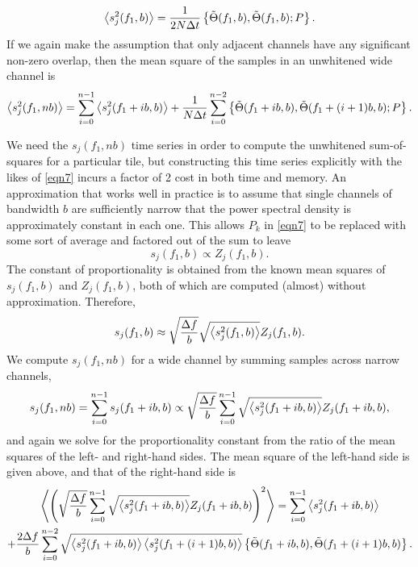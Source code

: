 \documentclass[10pt]{article}
\begin{document}
\begin{equation}
\left\langle s_{j}^{2}(f_{1}, b)\right\rangle
   = \frac{1}{2 N \Delta t} \left\{ \tilde{\Theta}(f_{1}, b),
   \tilde{\Theta}(f_{1}, b); P \right\}.
\end{equation}
If we again make the assumption that only adjacent channels have any
significant non-zero overlap, then the mean square of the samples in an
unwhitened wide channel is
\begin{equation}
\left\langle s_{j}^{2}(f_{1}, n b)\right\rangle
   = \sum_{i = 0}^{n - 1} \left\langle s_{j}^{2}(f_{1} + i b, b)\right\rangle + \frac{1}{N
   \Delta t} \sum_{i = 0}^{n - 2} \left\{ \tilde{\Theta}(f_{1} + i b, b),
   \tilde{\Theta}(f_{1} + (i + 1) b, b) ; P \right\}.
\end{equation}

We need the \(s_{j}(f_{1}, n b)\) time series in order to compute the
unwhitened sum-of-squares for a particular tile, but constructing this time
series explicitly with the likes of \eqref{eqn7} incurs a factor of 2 cost
in both time and memory.  An approximation that works well in practice is
to assume that single channels of bandwidth \(b\) are sufficiently narrow
that the power spectral density is approximately constant in each one.
This allows \(P_{k}\) in \eqref{eqn7} to be replaced with some sort of
average and factored out of the sum to leave
\begin{equation}
s_{j}(f_{1}, b)
   \propto Z_{j}(f_{1}, b).
\end{equation}
The constant of proportionality is obtained from the known mean squares of
\(s_{j}(f_{1}, b)\) and \(Z_{j}(f_{1}, b)\), both of which are computed
(almost) without approximation.  Therefore,
\begin{equation}
s_{j}(f_{1}, b)
   \approx \sqrt{\frac{\Delta f}{b}} \sqrt{\left\langle s_{j}^{2}(f_{1}, b)\right\rangle}
   Z_{j}(f_{1}, b).
\end{equation}
We compute \(s_{j}(f_{1}, n b)\) for a wide channel by summing samples
across narrow channels,
\begin{equation}
s_{j}(f_{1}, n b)
   = \sum_{i = 0}^{n -1} s_{j}(f_{1} + i b, b) \propto \sqrt{\frac{\Delta
   f}{b}} \sum_{i = 0}^{n -1} \sqrt{\left\langle s_{j}^{2}(f_{1} + i b, b)\right\rangle}
   Z_{j}(f_{1} + i b, b),
\end{equation}
and again we solve for the proportionality constant from the ratio of the
mean squares of the left- and right-hand sides.  The mean square of the
left-hand side is given above, and that of the right-hand side is
\begin{multline}
\left\langle\left( \sqrt{\frac{\Delta f}{b}} \sum_{i = 0}^{n -1}
\sqrt{\left\langle s_{j}^{2}(f_{1} + i b, b)\right\rangle} Z_{j}(f_{1} + i b, b) \right)^{2}\right\rangle
   = \sum_{i = 0}^{n -1} \left\langle s_{j}^{2}(f_{1} + i b, b)\right\rangle \\+ \frac{2
   \Delta f}{b} \sum_{i = 0}^{n - 2} \sqrt{\left\langle s_{j}^{2}(f_{1} + i b, b)\right\rangle
   \left\langle s_{j}^{2}(f_{1} + (i + 1) b, b)\right\rangle} \left\{ \tilde{\Theta}(f_{1} + i
   b, b), \tilde{\Theta}(f_{1} + (i + 1) b, b) \right\}.
\end{multline}
\end{document}
